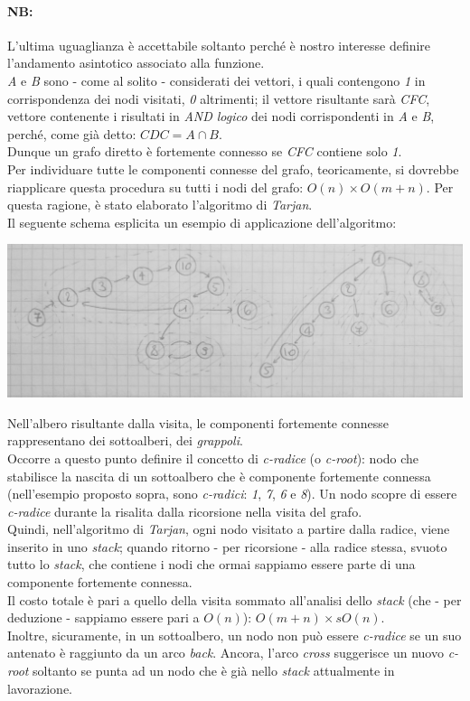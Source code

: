 \paragraph{NB:}
L'ultima uguaglianza è accettabile soltanto perché è nostro interesse definire l'andamento asintotico associato alla funzione. \\
\textit{A} e \textit{B} sono - come al solito - considerati dei vettori, i quali contengono \textit{1} in corrispondenza dei nodi visitati, \textit{0} altrimenti; il vettore risultante sarà \textit{CFC}, vettore contenente i risultati in \textit{AND logico} dei nodi corrispondenti in \textit{A} e \textit{B}, perché, come già detto: $ CDC = A\cap B $. \\
Dunque un grafo diretto è fortemente connesso se \textit{CFC} contiene solo \textit{1}. \\

Per individuare tutte le componenti connesse del grafo, teoricamente, si dovrebbe riapplicare questa procedura su tutti i nodi del grafo: $O(n)\times O(m+n)$.
Per questa ragione, è stato elaborato l'algoritmo di \textit{Tarjan}. \\
Il seguente schema esplicita un esempio di applicazione dell'algoritmo:
\begin{center}
    \includegraphics[width=.9\textwidth]{res/tarjan-grafo-albero.jpg} \hfill
\end{center}
Nell'albero risultante dalla visita, le componenti fortemente connesse rappresentano dei sottoalberi, dei \textit{grappoli}. \\
Occorre a questo punto definire il concetto di \textit{c-radice} (o \textit{c-root}): nodo che stabilisce la nascita di un sottoalbero che è componente fortemente connessa (nell'esempio proposto sopra, sono \textit{c-radici}: \textit{1}, \textit{7}, \textit{6} e \textit{8}).
Un nodo scopre di essere \textit{c-radice} durante la risalita dalla ricorsione nella visita del grafo. \\
Quindi, nell'algoritmo di \textit{Tarjan}, ogni nodo visitato a partire dalla radice, viene inserito in uno \textit{stack}; quando ritorno - per ricorsione - alla radice stessa, svuoto tutto lo \textit{stack}, che contiene i nodi che ormai sappiamo essere parte di una componente fortemente connessa. \\
Il costo totale è pari a quello della visita sommato all'analisi dello \textit{stack} (che - per deduzione -  sappiamo essere pari a $ O(n) $): $ O(m+n)\times sO(n) $. \\
Inoltre, sicuramente, in un sottoalbero, un nodo non può essere \textit{c-radice} se un suo antenato è raggiunto da un arco \textit{back}. Ancora, l'arco \textit{cross} suggerisce un nuovo \textit{c-root} soltanto se punta ad un nodo che è già nello \textit{stack} attualmente in lavorazione.

